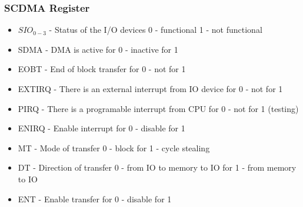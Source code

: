 \begin{frame}
    \frametitle{SCDMA Register}
    \begin{table}[]
    \end{table}
    \begin{itemize}
        \item $SIO_{0-3}$ - Status of the I/O devices 0 - functional 1 - not functional
        \item SDMA - DMA is active for 0 - inactive for 1
        \item EOBT - End of block transfer for 0 - not for 1
        \item EXTIRQ - There is an external interrupt from IO device for 0 - not for 1
        \item PIRQ - There is a programable interrupt from CPU for 0 - not for 1 (testing)
        \item ENIRQ - Enable interrupt for 0 - disable for 1
        \item MT - Mode of transfer 0 - block for 1 - cycle stealing
        \item DT - Direction of transfer 0 - from IO to memory to IO for 1 - from memory to IO
        \item ENT - Enable transfer for 0 - disable for 1
    \end{itemize}
    \note{
    }
\end{frame}

